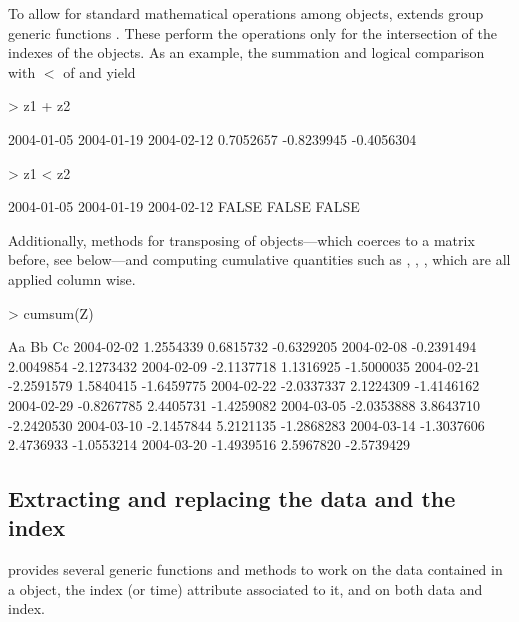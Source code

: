 \documentclass{Z}
\begin{document}
To allow for standard mathematical operations among 
objects,  extends group generic functions .
These perform the operations only for the intersection of the
indexes of the objects. As an example, the summation and logical
comparison with $<$ of  and  yield
\begin{Schunk}
\begin{Sinput}
> z1 + z2
\end{Sinput}
\begin{Soutput}
2004-01-05 2004-01-19 2004-02-12 
 0.7052657 -0.8239945 -0.4056304 
\end{Soutput}
\begin{Sinput}
> z1 < z2
\end{Sinput}
\begin{Soutput}
2004-01-05 2004-01-19 2004-02-12 
     FALSE      FALSE      FALSE 
\end{Soutput}
\end{Schunk}

Additionally, methods for transposing  of 
objects---which coerces to a matrix before, see below---and 
computing cumulative quantities such as
, , , 
which are all applied column wise.
\begin{Schunk}
\begin{Sinput}
> cumsum(Z)
\end{Sinput}
\begin{Soutput}
           Aa         Bb         Cc        
2004-02-02  1.2554339  0.6815732 -0.6329205
2004-02-08 -0.2391494  2.0049854 -2.1273432
2004-02-09 -2.1137718  1.1316925 -1.5000035
2004-02-21 -2.2591579  1.5840415 -1.6459775
2004-02-22 -2.0337337  2.1224309 -1.4146162
2004-02-29 -0.8267785  2.4405731 -1.4259082
2004-03-05 -2.0353888  3.8643710 -2.2420530
2004-03-10 -2.1457844  5.2121135 -1.2868283
2004-03-14 -1.3037606  2.4736933 -1.0553214
2004-03-20 -1.4939516  2.5967820 -2.5739429
\end{Soutput}
\end{Schunk}


\subsection{Extracting and replacing the data and the index}
\label{sec:window}

 provides several generic functions and methods
to work on the data contained in a  object, the
index (or time) attribute associated to it, and on both data and
index.
\end{document}
